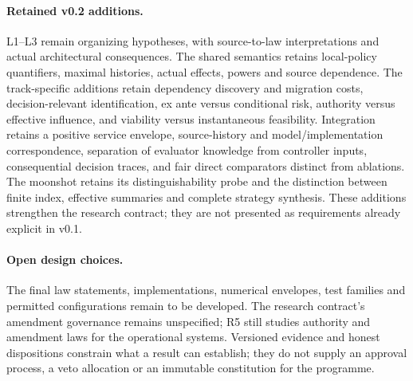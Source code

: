 \documentclass[11pt]{article}
\begin{document}
\begin{samepage}
\paragraph{Retained v0.2 additions.} L1--L3 remain organizing hypotheses, with source-to-law interpretations and actual architectural consequences. The shared semantics retains local-policy quantifiers, maximal histories, actual effects, powers and source dependence. The track-specific additions retain dependency discovery and migration costs, decision-relevant identification, ex ante versus conditional risk, authority versus effective influence, and viability versus instantaneous feasibility. Integration retains a positive service envelope, source-history and model/implementation correspondence, separation of evaluator knowledge from controller inputs, consequential decision traces, and fair direct comparators distinct from ablations. The moonshot retains its distinguishability probe and the distinction between finite index, effective summaries and complete strategy synthesis. These additions strengthen the research contract; they are not presented as requirements already explicit in v0.1.

\paragraph{Open design choices.} The final law statements, implementations, numerical envelopes, test families and permitted configurations remain to be developed. The research contract's amendment governance remains unspecified; R5 still studies authority and amendment laws for the operational systems. Versioned evidence and honest dispositions constrain what a result can establish; they do not supply an approval process, a veto allocation or an immutable constitution for the programme.
\end{samepage}
\end{document}
